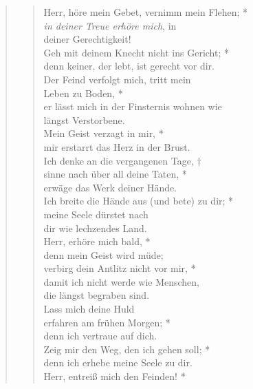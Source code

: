 
\vspace{0.3cm}


\vspace{0.3cm}
\begin{quote}

\begin{verse}
 Herr, höre mein Gebet, vernimm mein Flehen; *\\
\textit{in deiner Treue erhöre mich}, in \\deiner Gerechtigkeit!\\
\vin Geh mit deinem Knecht nicht ins Gericht; *\\
\vin denn keiner, der lebt, ist gerecht vor dir. \\
Der Feind verfolgt mich, tritt mein \\ Leben zu Boden, *\\
er lässt mich in der Finsternis wohnen wie \\ längst Verstorbene. \\
\vin Mein Geist verzagt in mir, *\\
\vin mir erstarrt das Herz in der Brust. \\
Ich denke an die vergangenen Tage, †\\
sinne nach über all deine Taten, *\\ erwäge das Werk deiner Hände. \\
\vin Ich breite die Hände aus (und bete) zu dir; *\\
\vin meine Seele dürstet nach\\ \vin  dir wie lechzendes Land. \\
Herr, erhöre mich bald, *\\
denn mein Geist wird müde; \\
\vin verbirg dein Antlitz nicht vor mir, * \\
\vin  damit ich nicht werde wie Menschen, \\ \vin die längst begraben sind.\\
Lass mich deine Huld \\erfahren am frühen Morgen; *\\
denn ich vertraue auf dich. \\
\vin Zeig mir den Weg, den ich gehen soll; *\\ \vin denn ich erhebe meine Seele zu dir. \\
Herr, entreiß mich den Feinden! *\\

\end{verse}
\end{quote}
